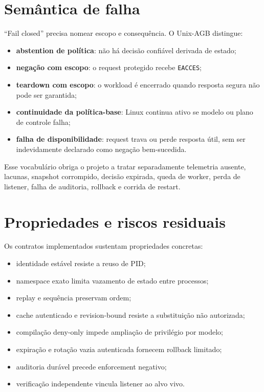 \documentclass[11pt,a4paper]{article}
\begin{document}
\section{Semântica de falha}

``Fail closed'' precisa nomear escopo e consequência. O Unix-AGB distingue:

\begin{itemize}[leftmargin=*]
  \item \textbf{abstention de política}: não há decisão confiável derivada de estado;
  \item \textbf{negação com escopo}: o request protegido recebe \texttt{EACCES};
  \item \textbf{teardown com escopo}: o workload é encerrado quando resposta
        segura não pode ser garantida;
  \item \textbf{continuidade da política-base}: Linux continua ativo se modelo
        ou plano de controle falha;
  \item \textbf{falha de disponibilidade}: request trava ou perde resposta útil,
        sem ser indevidamente declarado como negação bem-sucedida.
\end{itemize}

Esse vocabulário obriga o projeto a tratar separadamente telemetria ausente,
lacunas, snapshot corrompido, decisão expirada, queda de worker, perda de
listener, falha de auditoria, rollback e corrida de restart.

\section{Propriedades e riscos residuais}

Os contratos implementados sustentam propriedades concretas:

\begin{itemize}[leftmargin=*]
  \item identidade estável resiste a reuso de PID;
  \item namespace exato limita vazamento de estado entre processos;
  \item replay e sequência preservam ordem;
  \item cache autenticado e revision-bound resiste a substituição não autorizada;
  \item compilação deny-only impede ampliação de privilégio por modelo;
  \item expiração e rotação vazia autenticada fornecem rollback limitado;
  \item auditoria durável precede enforcement negativo;
  \item verificação independente vincula listener ao alvo vivo.
\end{itemize}
\end{document}
